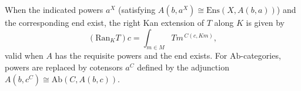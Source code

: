 When the indicated powers $a^X$ (satisfying $A(b, a^X) \cong \mathrm{Ens}(X, A(b, a))$) and the corresponding end exist, the right Kan extension of $T$ along $K$ is given by
$$(\mathrm{Ran}_K T)c = \int_{m \in M} Tm^{\,C(c, Km)},$$
valid when $A$ has the requisite powers and the end exists. For $\mathrm{Ab}$-categories, powers are replaced by cotensors $a^C$ defined by the adjunction $A(b, c^C) \cong \mathrm{Ab}(C, A(b, c))$.
